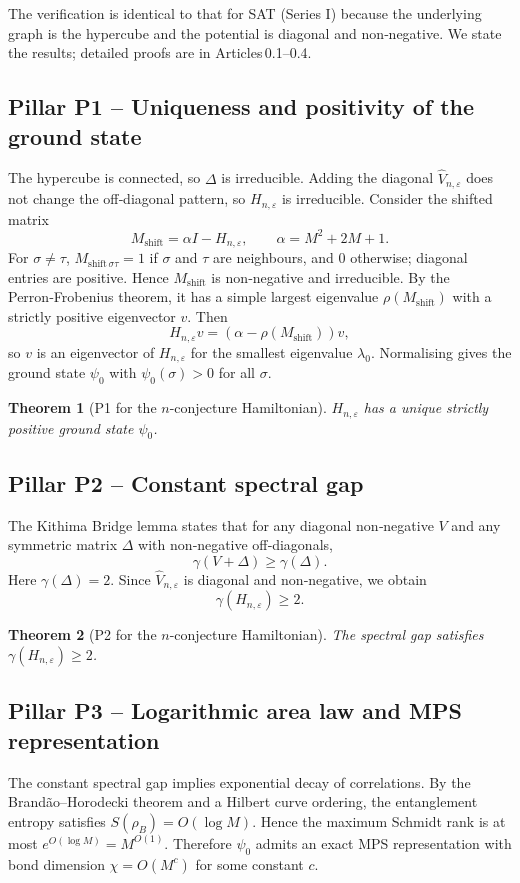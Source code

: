 \documentclass[11pt,a4paper]{article}
\newtheorem{theorem}{Theorem}[section]
\begin{document}
The verification is identical to that for SAT (Series I) because the underlying graph is the hypercube and the potential is diagonal and non‑negative. We state the results; detailed proofs are in Articles 0.1–0.4.

\subsection{Pillar P1 – Uniqueness and positivity of the ground state}
The hypercube is connected, so $\Delta$ is irreducible. Adding the diagonal $\hat{V}_{n,\varepsilon}$ does not change the off‑diagonal pattern, so $H_{n,\varepsilon}$ is irreducible. Consider the shifted matrix
\[
M_{\text{shift}} = \alpha I - H_{n,\varepsilon},\qquad \alpha = M^2 + 2M + 1.
\]
For $\sigma\neq\tau$, $M_{\text{shift}\,\sigma\tau} = 1$ if $\sigma$ and $\tau$ are neighbours, and $0$ otherwise; diagonal entries are positive. Hence $M_{\text{shift}}$ is non‑negative and irreducible. By the Perron‑Frobenius theorem, it has a simple largest eigenvalue $\rho(M_{\text{shift}})$ with a strictly positive eigenvector $v$. Then
\[
H_{n,\varepsilon} v = (\alpha - \rho(M_{\text{shift}})) v,
\]
so $v$ is an eigenvector of $H_{n,\varepsilon}$ for the smallest eigenvalue $\lambda_0$. Normalising gives the ground state $\psi_0$ with $\psi_0(\sigma) > 0$ for all $\sigma$.

\begin{theorem}[P1 for the $n$-conjecture Hamiltonian]
$H_{n,\varepsilon}$ has a unique strictly positive ground state $\psi_0$.
\end{theorem}

\subsection{Pillar P2 – Constant spectral gap}
The Kithima Bridge lemma states that for any diagonal non‑negative $V$ and any symmetric matrix $\Delta$ with non‑negative off‑diagonals,
\[
\gamma(V + \Delta) \ge \gamma(\Delta).
\]
Here $\gamma(\Delta) = 2$. Since $\hat{V}_{n,\varepsilon}$ is diagonal and non‑negative, we obtain
\[
\gamma(H_{n,\varepsilon}) \ge 2.
\]

\begin{theorem}[P2 for the $n$-conjecture Hamiltonian]
The spectral gap satisfies $\gamma(H_{n,\varepsilon}) \ge 2$.
\end{theorem}

\subsection{Pillar P3 – Logarithmic area law and MPS representation}
The constant spectral gap implies exponential decay of correlations. By the Brandão–Horodecki theorem and a Hilbert curve ordering, the entanglement entropy satisfies $S(\rho_B) = O(\log M)$. Hence the maximum Schmidt rank is at most $e^{O(\log M)} = M^{O(1)}$. Therefore $\psi_0$ admits an exact MPS representation with bond dimension $\chi = O(M^c)$ for some constant $c$.
\end{document}
